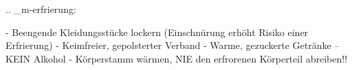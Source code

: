 
.. _m-erfrierung:


\begin{itemize}
  -   Beengende Kleidungsstücke lockern (Einschnürung erhöht
  Risiko einer Erfrierung)
  -   Keimfreier, gepolsterter Verband
  -   Warme, gezuckerte Getränke -- KEIN Alkohol
  -   Körperstamm wärmen, NIE den erfrorenen Körperteil abreiben!!
\end{itemize}